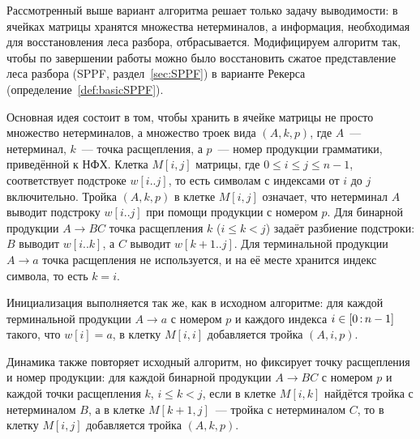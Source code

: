 Рассмотренный выше вариант алгоритма решает только задачу выводимости: в ячейках матрицы хранятся множества нетерминалов, а информация, необходимая для восстановления леса разбора, отбрасывается.
Модифицируем алгоритм так, чтобы по завершении работы можно было восстановить сжатое представление леса разбора (SPPF, раздел~\ref{sec:SPPF}) в варианте Рекерса (определение~\ref{def:basicSPPF}).

Основная идея состоит в том, чтобы хранить в ячейке матрицы не просто множество нетерминалов, а множество троек вида $(A, k, p)$, где $A$~--- нетерминал, $k$~--- точка расщепления, а $p$~--- номер продукции грамматики, приведённой к НФХ.
Клетка $M[i,j]$ матрицы, где $0 \leq i \leq j \leq n-1$, соответствует подстроке $w[i..j]$, то есть символам с индексами от $i$ до $j$ включительно.
Тройка $(A, k, p)$ в клетке $M[i,j]$ означает, что нетерминал $A$ выводит подстроку $w[i..j]$ при помощи продукции с номером $p$.
Для бинарной продукции $A \to B C$ точка расщепления $k$ ($i \leq k < j$) задаёт разбиение подстроки: $B$ выводит $w[i..k]$, а $C$ выводит $w[k+1..j]$.
Для терминальной продукции $A \to a$ точка расщепления не используется, и на её месте хранится индекс символа, то есть $k = i$.

Инициализация выполняется так же, как в исходном алгоритме: для каждой терминальной продукции $A \to a$ с номером $p$ и каждого индекса $i \in [0 \rng n-1]$ такого, что $w[i] = a$, в клетку $M[i,i]$ добавляется тройка $(A, i, p)$.

Динамика также повторяет исходный алгоритм, но фиксирует точку расщепления и номер продукции: для каждой бинарной продукции $A \to B C$ с номером $p$ и каждой точки расщепления $k$, $i \leq k < j$, если в клетке $M[i,k]$ найдётся тройка с нетерминалом $B$, а в клетке $M[k+1,j]$~--- тройка с нетерминалом $C$, то в клетку $M[i,j]$ добавляется тройка $(A, k, p)$.

